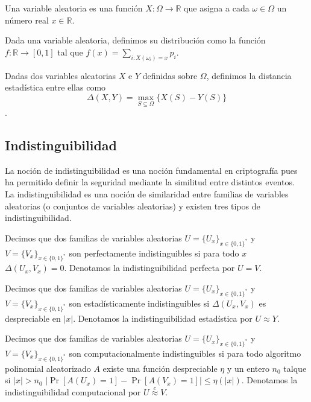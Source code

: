 \begin{definicion}
Una variable aleatoria es una función $X:\Omega \to \mathbb{R}$ que asigna a
cada $\omega \in \Omega$ un número real $x \in \mathbb{R}$.
\end{definicion}

\begin{definicion}[Distribución]
Dada una variable aleatoria, definimos su distribución como la función
$f:\mathbb{R} \to [0,1]$ tal que $f(x) = \sum_{i:X(\omega_i)=x}p_i$.
\end{definicion}

\begin{definicion}
Dadas dos variables aleatorias $X$ e $Y$ definidas sobre $\Omega$, definimos
la distancia estadística entre ellas como
$$\Delta(X, Y) = \max_{S\subseteq \Omega}\{X(S)-Y(S)\}$$.
\end{definicion}

\subsection{Indistinguibilidad}
La noción de indistinguibilidad es una noción fundamental en criptografía
pues ha permitido definir la seguridad mediante la similitud entre distintos
eventos.\\
La indistinguibilidad es una noción
de similaridad entre familias de variables aleatorias (o conjuntos
de variables aleatorias) y existen tres tipos de indistinguibilidad.

\begin{definicion}
Decimos que dos familias de variables aleatorias $U=\{U_x\}_{x\in\{0,1\}^*}$
y $V=\{V_x\}_{x\in\{0,1\}^*}$ son perfectamente indistinguibles
si para todo $x$ $\Delta(U_x, V_x) = 0$.
Denotamos la indistinguibilidad perfecta por $U = V$.
\end{definicion}

\begin{definicion}
Decimos que dos familias de variables aleatorias $U=\{U_x\}_{x\in\{0,1\}^*}$ y 
$V=\{V_x\}_{x\in\{0,1\}^*}$ son estadísticamente indistinguibles
si $\Delta(U_x, V_x)$ es despreciable en $|x|$. Denotamos la indistinguibilidad estadística
por $U \approx Y$.
\end{definicion}

\begin{definicion}
Decimos que dos familias de variables aleatorias $U=\{U_x\}_{x\in\{0,1\}^*}$ y
$V=\{V_x\}_{x\in\{0,1\}^*}$ son computacionalmente indistinguibles si
para todo algoritmo polinomial aleatorizado $A$ existe una función despreciable
$\eta$ y un entero $n_0$ talque si $|x| > n_0$
$|\Pr[A(U_x)=1] - \Pr[A(V_x)=1]| \leq \eta(|x|)$. Denotamos la indistinguibilidad
computacional por $U \overset{c}{\approx} V$.
\end{definicion}

